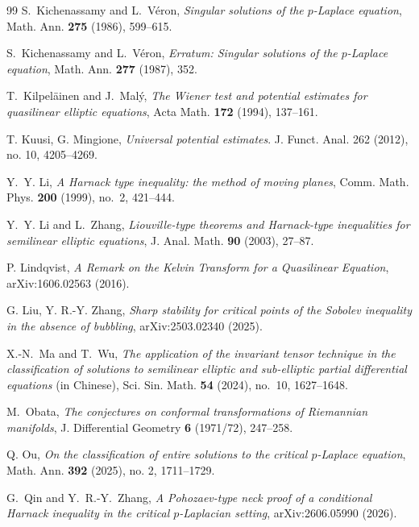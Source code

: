 \documentclass[reqno,12pt]{amsart}
\numberwithin{equation}{section}
\theoremstyle{remark}
\begin{document}
\begin{thebibliography}{99}
S.~Kichenassamy and L.~V\'eron,
\emph{Singular solutions of the $p$-Laplace equation},
Math. Ann. \textbf{275} (1986), 599--615.

S.~Kichenassamy and L.~V\'eron,
\emph{Erratum: Singular solutions of the $p$-Laplace equation},
Math. Ann. \textbf{277} (1987), 352.

T.~Kilpel\"ainen and J.~Mal\'y,
\emph{The Wiener test and potential estimates for quasilinear elliptic equations},
Acta Math. \textbf{172} (1994), 137--161. 

T. Kuusi, G. Mingione,
\emph{Universal potential estimates}.
J. Funct. Anal. 262 (2012), no. 10, 4205--4269.

Y.~Y. Li,
\emph{A Harnack type inequality: the method of moving planes},
Comm. Math. Phys. \textbf{200} (1999), no.~2, 421--444.

Y.~Y. Li and L.~Zhang,
\emph{Liouville-type theorems and Harnack-type inequalities for semilinear elliptic equations},
J. Anal. Math. \textbf{90} (2003), 27--87.

P. Lindqvist, \emph{A Remark on the Kelvin Transform for a Quasilinear Equation}, 
arXiv:1606.02563 (2016).


G. Liu, Y. R.-Y. Zhang, \emph{Sharp stability for critical points of the Sobolev inequality in the absence of bubbling}, arXiv:2503.02340 (2025).


X.-N.~Ma and T.~Wu,
\emph{The application of the invariant tensor technique in the
classification of solutions to semilinear elliptic and sub-elliptic partial differential equations} (in Chinese),
Sci. Sin. Math. \textbf{54} (2024), no.~10, 1627--1648.


M.~Obata,
\emph{The conjectures on conformal transformations of Riemannian manifolds},
J. Differential Geometry \textbf{6} (1971/72), 247--258.


Q. Ou,
\emph{On the classification of entire solutions to the critical $p$-Laplace equation},
Math. Ann. \textbf{392} (2025), no. 2, 1711--1729.


G.~Qin and Y.~R.-Y.~Zhang,
\emph{A Pohozaev-type neck proof of a conditional Harnack inequality in the critical $p$-Laplacian setting},
arXiv:2606.05990 (2026).


\end{thebibliography}
\end{document}

